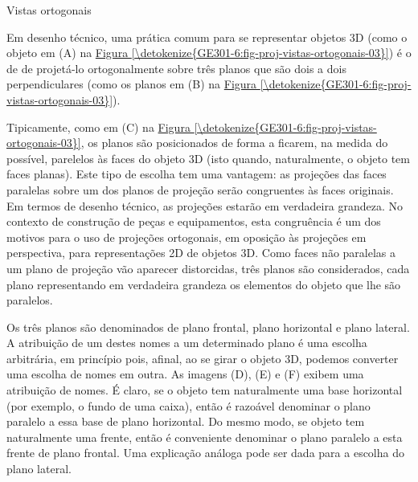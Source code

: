 \label{\detokenize{GE301-6:ativ-proj-vistas-ortogonais}}
\begin{task}{Vistas ortogonais}

Em desenho técnico, uma prática comum para se representar objetos 3D (como o objeto em (A) na \hyperref[\detokenize{GE301-6:fig-proj-vistas-ortogonais-03}]{Figura \ref{\detokenize{GE301-6:fig-proj-vistas-ortogonais-03}}}) é o de de projetá-lo ortogonalmente sobre três planos que são dois a dois perpendiculares (como os planos em (B) na \hyperref[\detokenize{GE301-6:fig-proj-vistas-ortogonais-03}]{Figura \ref{\detokenize{GE301-6:fig-proj-vistas-ortogonais-03}}}).

Tipicamente, como em (C) na \hyperref[\detokenize{GE301-6:fig-proj-vistas-ortogonais-03}]{Figura \ref{\detokenize{GE301-6:fig-proj-vistas-ortogonais-03}}}, os planos são posicionados de forma a ficarem, na medida do possível, parelelos às faces do objeto 3D (isto quando, naturalmente, o objeto tem faces planas). Este tipo de escolha tem uma vantagem: as projeções das faces paralelas sobre um dos planos de projeção serão congruentes às faces originais. Em termos de desenho técnico, as projeções estarão em verdadeira grandeza. No contexto de construção de peças e equipamentos, esta congruência é um dos motivos para o uso de projeções ortogonais, em oposição às projeções em perspectiva, para representações 2D de objetos 3D. Como faces não paralelas a um plano de projeção vão aparecer distorcidas, três planos são considerados, cada plano representando em verdadeira grandeza os elementos do objeto que lhe são paralelos.

Os três planos são denominados de plano frontal, plano horizontal e plano lateral. A atribuição de um destes nomes a um determinado plano é uma escolha arbitrária, em princípio pois, afinal, ao se girar o objeto 3D, podemos converter uma escolha de nomes em outra. As imagens (D), (E) e (F) exibem uma atribuição de nomes. É claro, se o objeto tem naturalmente uma base horizontal (por exemplo, o fundo de uma caixa), então é razoável denominar o plano paralelo a essa base de plano horizontal. Do mesmo modo, se objeto tem naturalmente uma frente, então é conveniente denominar o plano paralelo a esta frente de plano frontal. Uma explicação análoga pode ser dada para a escolha do plano lateral.


\begin{minipage}{\linewidth}
\begin{figure}[H]
\centering
\ifnum{}


\end{figure}
\end{minipage}
\end{task}
